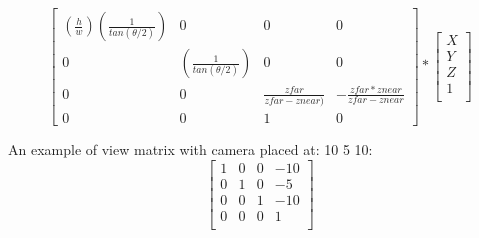 \[
\begin{bmatrix}
(\frac{h}{w})(\frac{1}{tan(\theta/2)}) & 0 & 0 & 0\\
0 & (\frac{1}{tan(\theta/2)}) & 0 & 0\\
0 & 0 & \frac{zfar}{zfar - znear)} & -\frac{zfar * znear}{zfar-znear}\\
0 & 0 & 1 & 0
\end{bmatrix} 
*
\begin{bmatrix}
X\\
Y\\
Z\\
1\\
\end{bmatrix} 
\]

An example of view matrix with camera placed at: 10 5 10:
\[
\begin{bmatrix}
1 & 0 & 0 & -10\\
0 & 1 & 0 & -5\\
0 & 0 & 1 & -10\\
0 & 0 & 0 & 1\\
\end{bmatrix} 
\]